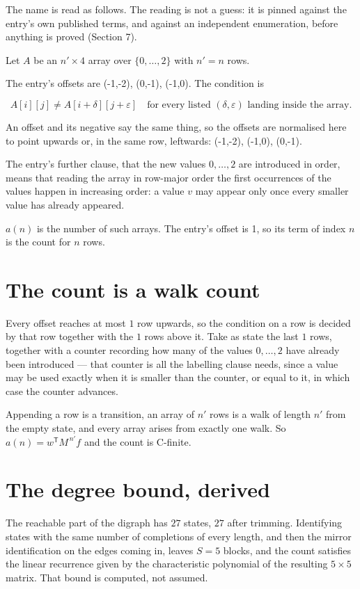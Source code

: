 \documentclass[11pt]{article}
\theoremstyle{definition}
\begin{document}
The name is read as follows. The reading is not a guess: it is pinned against the entry's own published terms, and against an independent enumeration, before anything is proved (Section 7).

Let $A$ be an $n' \times 4$ array over $\{0,\dots,2\}$ with $n' = n$ rows.

The entry's offsets are (-1,-2), (0,-1), (-1,0). The condition is

\[A[i][j] \ne A[i{+}\delta][j{+}\varepsilon]\quad\text{for every listed }(\delta,\varepsilon)\text{ landing inside the array.}\]

An offset and its negative say the same thing, so the offsets are normalised here to point upwards or, in the same row, leftwards: (-1,-2), (-1,0), (0,-1).

The entry's further clause, that the new values $0,\dots,2$ are introduced in order, means that reading the array in row-major order the first occurrences of the values happen in increasing order: a value $v$ may appear only once every smaller value has already appeared.

$a(n)$ is the number of such arrays. The entry's offset is 1, so its term of index $n$ is the count for $n$ rows.

\section{The count is a walk count}

Every offset reaches at most $1$ row upwards, so the condition on a row is decided by that row together with the $1$ rows above it. Take as state the last $1$ rows, together with a counter recording how many of the values $0,\dots,2$ have already been introduced --- that counter is all the labelling clause needs, since a value may be used exactly when it is smaller than the counter, or equal to it, in which case the counter advances.

Appending a row is a transition, an array of $n'$ rows is a walk of length $n'$ from the empty state, and every array arises from exactly one walk. So $a(n) = w^{\mathsf T}M^{\,n'}f$ and the count is C-finite.

\section{The degree bound, derived}

The reachable part of the digraph has $27$ states, $27$ after trimming. Identifying states with the same number of completions of every length, and then the mirror identification on the edges coming in, leaves $S = 5$ blocks, and the count satisfies the linear recurrence given by the characteristic polynomial of the resulting $5\times5$ matrix. That bound is computed, not assumed.
\end{document}
